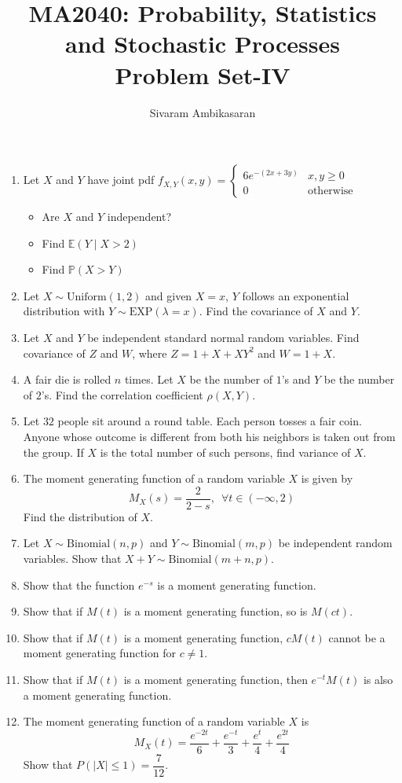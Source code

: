 \documentclass{article}
\title{MA2040: Probability, Statistics and Stochastic Processes\\
Problem Set-IV}
\author{Sivaram Ambikasaran}
\newcommand{\abs}[1]{\displaystyle\left\lvert#1\right\rvert}
\newcommand{\Pb}{\mathbb{P}}
\newcommand{\bkt}[1]{\left(#1\right)}
\begin{document}
	\maketitle
	\begin{enumerate}
		\item
		Let $X$ and $Y$ have joint pdf $f_{X,Y}(x,y) = \begin{cases}
		6 e^{-\bkt{2x+3y}} & x,y \geq 0\\
		0 & \text{otherwise}
		\end{cases}$
	\begin{itemize}
		\item
		Are $X$ and $Y$ independent?
		\item
		Find $\mathbb{E}\bkt{Y \mid X>2}$
		\item
		Find $\Pb\bkt{X > Y}$
	\end{itemize}
	\item
	Let $X \sim \text{Uniform}(1,2)$ and given $X=x$, $Y$ follows an exponential distribution with $Y \sim \text{EXP}\bkt{\lambda=x}$. Find the covariance of $X$ and $Y$.
	\item
	Let $X$ and $Y$ be independent standard normal random variables. Find covariance of $Z$ and $W$, where $Z = 1+X+XY^2$ and $W = 1+X$.
	\item
	A fair die is rolled $n$ times. Let $X$ be the number of $1$'s and $Y$ be the number of $2$'s. Find the correlation coefficient $\rho(X,Y)$.
	\item
	Let $32$ people sit around a round table. Each person tosses a fair coin. Anyone whose outcome is different from both his neighbors is taken out from the group. If $X$ is the total number of such persons, find variance of $X$.
	\item
	The moment generating function of a random variable $X$ is given by
	$$M_X(s) = \dfrac2{2-s}, \,\,\, \forall t \in (-\infty,2)$$
	Find the distribution of $X$.
	\item
	Let $X \sim \text{Binomial}(n,p)$ and $Y \sim \text{Binomial}(m,p)$ be independent random variables. Show that $X+Y \sim \text{Binomial}(m+n,p)$.
	\item
	Show that the function $e^{-s}$ is a moment generating function.
	\item
	Show that if $M(t)$ is a moment generating function, so is $M(ct)$.
	\item
	Show that if $M(t)$ is a moment generating function, $cM(t)$ cannot be a moment generating function for $c \neq 1$.
	\item
	Show that if $M(t)$ is a moment generating function, then $e^{-t}M(t)$ is also a moment generating function.
	\item
	The moment generating function of a random variable $X$ is
	$$M_X(t) = \dfrac{e^{-2t}}6 + \dfrac{e^{-t}}3 + \dfrac{e^{t}}4 + \dfrac{e^{2t}}4$$
	Show that $P\bkt{\abs{X} \leq 1} = \dfrac7{12}$.
	\end{enumerate}
\end{document}
